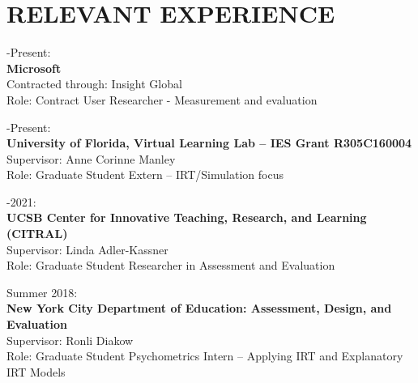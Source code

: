 \documentclass[12pt, oneside,]{memoir}
\begin{document}
\hypertarget{relevant-experience}{%
\section{RELEVANT EXPERIENCE}\label{relevant-experience}}

-Present:\\
\textbf{Microsoft}\\
\hspace*{0.333em}\hspace*{0.333em} Contracted through: Insight Global\\
\hspace*{0.333em}\hspace*{0.333em} Role: Contract User Researcher - Measurement and evaluation


-Present:\\
\textbf{University of Florida, Virtual Learning Lab -- IES Grant R305C160004}\\
\hspace*{0.333em}\hspace*{0.333em} Supervisor: Anne Corinne Manley\\
\hspace*{0.333em}\hspace*{0.333em} Role: Graduate Student Extern -- IRT/Simulation focus

-2021:\\
\textbf{UCSB Center for Innovative Teaching, Research, and Learning
(CITRAL)}\\
\hspace*{0.333em}\hspace*{0.333em}Supervisor: Linda Adler-Kassner\\
\hspace*{0.333em}\hspace*{0.333em}Role: Graduate Student Researcher in
Assessment and Evaluation

\noindent Summer 2018:\\
\textbf{New York City Department of Education: Assessment, Design, and
Evaluation}\\
\hspace*{0.333em}\hspace*{0.333em}Supervisor: Ronli Diakow\\
\hspace*{0.333em}\hspace*{0.333em}Role: Graduate Student Psychometrics
Intern -- Applying IRT and Explanatory IRT Models
\end{document}
